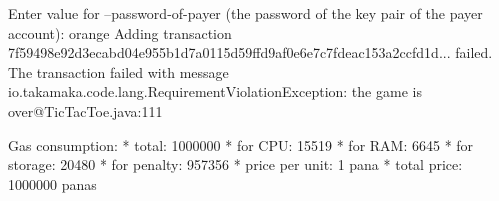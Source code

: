 \begin{shellbox}\begin{ttlst}
Enter value for --password-of-payer (the password of the key pair of the payer account): orange
Adding transaction 7f59498e92d3ecabd04e955b1d7a0115d59ffd9af0e6e7c7fdeac153a2ccfd1d... failed.
The transaction failed with message io.takamaka.code.lang.RequirementViolationException: the game is over@TicTacToe.java:111

Gas consumption:
 * total: 1000000
   * for CPU: 15519
   * for RAM: 6645
   * for storage: 20480
   * for penalty: 957356
 * price per unit: 1 pana
 * total price: 1000000 panas
\end{ttlst}\end{shellbox}
